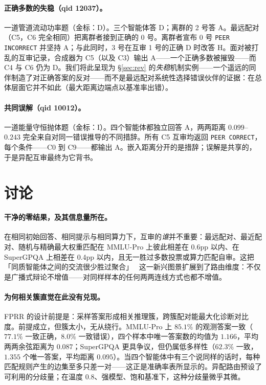 \documentclass[UTF8,11pt]{ctexart}
\begin{document}
\paragraph{正确多数的失稳（qid 12037）。}
一道管道流动功率题（金标：D）。三个智能体答 D；离群的 2 号答 A。最远配对（C5，C6 完全相同）把离群者接到正确的 0 号。离群者宣布 0 号 \texttt{PEER INCORRECT} 并坚持 A；与此同时，3 号在互审 1 号的正确 D 时改答 H。面对被打乱的互审记录，合成器为 C5（以及 C3）输出 A——一个正确多数被摧毁——而 C4 与 C6 仍为 D。我们将此呈现为 \S\ref{sec:rev} 的\emph{失稳}机制实例——一个遥远的同伴制造了对正确答案的反对——而不是最远配对系统性选择错误伙伴的证据：在总体层面它并不如此（最大距离边端点以基准率出错）。

\paragraph{共同误解（qid 10012）。}
一道能量守恒抛体题（金标：I）。四个智能体都独立回答 A，两两距离 $0.099$--$0.243$ 完全来自对同一错误推导的不同措辞。所有 C5 互审均返回 \texttt{PEER CORRECT}，每个条件——C0 到 C9——都输出 A。嵌入距离分开的是措辞；误解是共享的，于是异配互审最终为它背书。

\section{讨论}
\label{sec:discussion}

\paragraph{干净的零结果，及其信息量所在。}
在相同初始回答、相同提示与相同算力下，互审的\emph{谁}并不重要：最远配对、最近配对、随机与精确最大权重匹配在 MMLU-Pro 上彼此相差在 0.6pp 以内、在 SuperGPQA 上相差在 0.4pp 以内，且无一胜过多数投票或算力匹配自审。这把「同质智能体之间的交流很少胜过聚合」~\cite{yang2025revisiting,choi2025debateorvote} 这一新兴图景扩展到了路由维度：不仅是广播式辩论不增值——对同样样本的任何两两连线方式也都不增值。

\paragraph{为何相关簇直觉在此没有兑现。}
FPRR 的设计前提是：采样答案形成相关推理簇，跨簇配对能最大化诊断对比度。前提成立，但簇太小，无从绕行。MMLU-Pro 上 $85.1\%$ 的观测答案一致（$77.1\%$ 一致正确，$8.0\%$ 一致错误），四个样本中唯一答案数的均值为 $1.166$，平均两两余弦距离为 $0.087$；SuperGPQA 更具争议，但仍属低多样性（$62.3\%$ 一致，$1.355$ 个唯一答案，平均距离 $0.095$）。当四个智能体中有三个说同样的话时，每种匹配规则产生的边集至多只差一对——这正是准确率表所显示的。异配路由预设了可利用的分歧量；在温度 $0.8$、强模型、饱和基准下，这种分歧量微乎其微。
\end{document}
